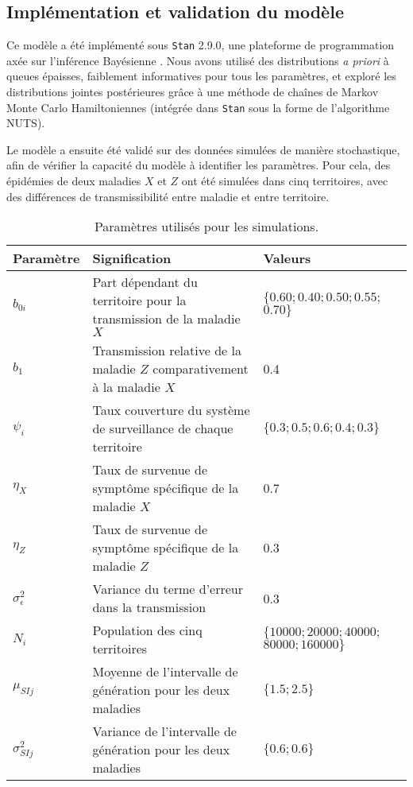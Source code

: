\subsection{Implémentation et validation du modèle}

Ce modèle a été implémenté sous \texttt{Stan} 2.9.0, une plateforme de programmation axée sur l'inférence Bayésienne \cite{carpenter2015stan}.
Nous avons utilisé des distributions {\em a priori} à queues épaisses, faiblement informatives pour tous les paramètres, et exploré les distributions jointes postérieures grâce à une méthode de chaînes de Markov Monte Carlo Hamiltoniennes (intégrée dans  \texttt{Stan} sous la forme de l'algorithme NUTS).

Le modèle a ensuite été validé sur des données simulées de manière stochastique, afin de vérifier la capacité du modèle à identifier les paramètres.
Pour cela, des épidémies de deux maladies $X$ et $Z$ ont été simulées dans cinq territoires, avec des différences de transmissibilité entre maladie et entre territoire.
\begin{table}[t]
\centering
\caption{Paramètres utilisés pour les simulations. \vspace{.5em}}
\label{table:simpar}
\begin{tabular}{L{2cm}L{7cm}L{4cm}}
\hline
Paramètre & Signification & Valeurs \\
\hline
$b_{0i}$ & Part dépendant du territoire pour la transmission de la maladie $X$ & $\{0.60; 0.40;0.50;0.55;$ $0.70\}$ \\
$b_1$ & Transmission relative de la maladie $Z$ comparativement à la maladie $X$ & 0.4 \\
$\psi_i$ &  Taux couverture du système de surveillance de chaque territoire & $\{0.3; 0.5; 0.6; 0.4; 0.3\}$ \\
$\eta_X$ & Taux de survenue de symptôme spécifique de la maladie $X$ & 0.7 \\
$\eta_Z$ & Taux de survenue de symptôme spécifique de la maladie $Z$ & 0.3 \\
$\sigma_{\epsilon}^2$ & Variance du terme d'erreur dans la transmission & 0.3 \\
$N_i$ & Population des cinq territoires & $\{10000; 20000; 40000;$ $80000; 160000\}$ \\
$\mu_{SIj}$ & Moyenne de l'intervalle de génération pour les deux maladies & $\{1.5; 2.5\}$ \\
$\sigma_{SIj}^2$ & Variance de l'intervalle de génération pour les deux maladies & $\{0.6; 0.6\}$ \\
\hline
\end{tabular}
\end{table}

